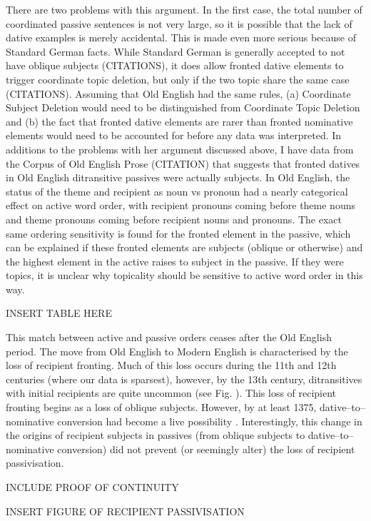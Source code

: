 	There are two problems with this argument. In the first case, the total number of coordinated passive sentences is not very large, so it is possible that the lack of dative examples is merely accidental. This is made even more serious because of Standard German facts. While Standard German is generally accepted to not have oblique subjects (CITATIONS), it does allow fronted dative elements to trigger coordinate topic deletion, but only if the two topic share the same case (CITATIONS). Assuming that Old English had the same rules, (a) Coordinate Subject Deletion would need to be distinguished from Coordinate Topic Deletion and (b) the fact that fronted dative elements are rarer than fronted nominative elements would need to be accounted for before any data was interpreted. 
	In additions to the problems with her argument discussed above, I have data from the Corpus of Old English Prose (CITATION) that suggests that fronted datives in Old English ditransitive passives were actually subjects. In Old English, the status of the theme and recipient as noun vs pronoun had a nearly categorical effect on active word order, with recipient pronouns coming before theme nouns and theme pronouns coming before recipient nouns and pronouns. The exact same ordering sensitivity is found for the fronted element in the passive, which can be explained if these fronted elements are subjects (oblique or otherwise) and the highest element in the active raises to subject in the passive. If they were topics, it is unclear why topicality should be sensitive to active word order in this way.

	INSERT TABLE HERE
	
	This match between active and passive orders ceases after the Old English period. The move from Old English to Modern English is characterised by the loss of recipient fronting. Much of this loss occurs during the 11th and 12th centuries (where our data is sparsest), however, by the 13th century, ditransitives with initial recipients are quite uncommon (see Fig. ). This loss of recipient fronting begins as a loss of oblique subjects. However, by at least 1375, dative--to--nominative conversion had become a live possibility \citep{Allen.1999}. Interestingly, this change in the origins of recipient subjects in passives (from oblique subjects to dative--to--nominative conversion) did not prevent (or seemingly alter) the loss of recipient passivisation.

	INCLUDE PROOF OF CONTINUITY

	INSERT FIGURE OF RECIPIENT PASSIVISATION

